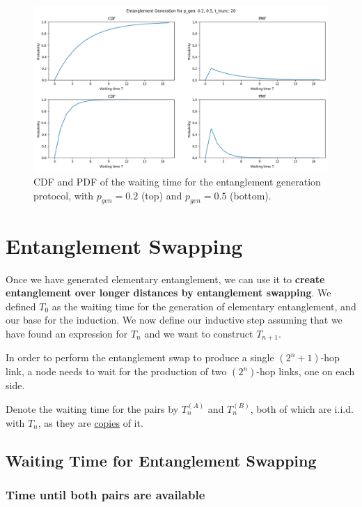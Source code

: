 \documentclass{masterthesis}
\begin{document}
\begin{figure}[ht]
    \centering
    \includegraphics[width=1\linewidth]{images/gen_example_20.png}
    \caption{CDF and PDF of the waiting time for the entanglement generation protocol, with $p_{gen} = 0.2$ (top) and $p_{gen} = 0.5$ (bottom).}
\end{figure}

\newpage
\section*{Entanglement Swapping}

Once we have generated elementary entanglement, we can use it to \textbf{create entanglement over longer distances by entanglement swapping}.
We defined $T_0$ as the waiting time for the generation of elementary entanglement, and our base for the induction.
We now define our inductive step assuming that we have found an expression for $T_n$ and we want to construct $T_{n+1}$. 

In order to perform the entanglement swap to produce a single $(2^n+1)$-hop link, a node needs to wait for the production of two $(2^n)$-hop links, one on each side. 

Denote the waiting time for the pairs by $T_n^{(A)}$ and $T_n^{(B)}$, both of which are i.i.d. with $T_n$, as they are \hyperref[paragraph:copies_of_a_random_variable]{copies} of it. 

\subsection*{Waiting Time for Entanglement Swapping}

\subsubsection*{Time until both pairs are available}
\end{document}
